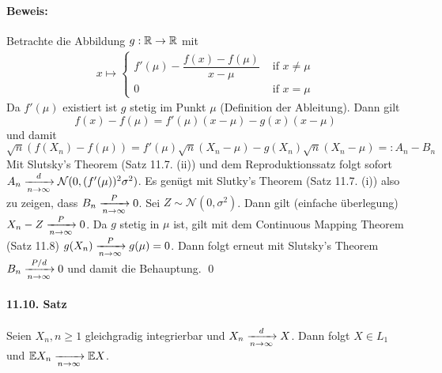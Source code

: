 \documentclass[11pt]{report}
\begin{document}
\paragraph{Beweis:}Betrachte die Abbildung $g:\mathbb{R}\to\mathbb{R}$ mit 
\begin{align*}
    x\mapsto
\begin{cases}
    f'(\mu)-\dfrac{f(x)-f(\mu)}{x-\mu} &\text{ if }x\neq\mu \\
    0 &\text{ if } x=\mu
\end{cases}
\end{align*}
Da $f'(\mu)$ existiert ist $g$ stetig im Punkt $\mu$ (Definition der Ableitung). Dann gilt 
$$f(x)-f(\mu)=f'(\mu)(x-\mu)-g(x)(x-\mu)$$
und damit
$$\sqrt{n}(f(X_n)-f(\mu))=f'(\mu)\sqrt{n}(X_n-\mu)-g(X_n)\sqrt{n}(X_n-\mu)=:A_n-B_n$$
Mit Slutsky's Theorem (Satz 11.7. (ii)) und dem Reproduktionssatz folgt sofort $A_n\nto{d}{n\to\infty}\mathcal{N}(0,(f'(\mu))^2\sigma^2)$. Es gen\"ugt mit Slutky's Theorem (Satz 11.7. (i)) also zu zeigen, dass $B_n\nto{P}{n\to\infty}0$. \newline\newline
Sei $Z\sim\mathcal{N}(0,\sigma^2)$. Dann gilt (einfache \"uberlegung) $X_n-Z\nto{P}{n\to\infty}0$. Da $g$ stetig in $\mu$ ist, gilt mit dem Continuous Mapping Theorem (Satz 11.8) $g(X_n)\nto{P}{n\to\infty}g(\mu)=0$. Dann folgt erneut mit Slutsky's Theorem $B_n\nto{P/d}{n\to\infty}0$ und damit die Behauptung. \qed

\paragraph{11.10. Satz} Seien $X_n,n\geq 1$ gleichgradig integrierbar und $X_n\nto{d}{n\to\infty}X$. Dann folgt $X\in L_1$ und $\E X_n\nto{}{n\to\infty}\E X$.
\end{document}
